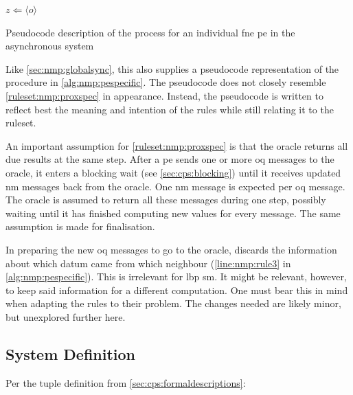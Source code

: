 \begin{algorithm}
{    \;
    
    \(z \Leftarrow \langle o \rangle\)\;
}
\caption[Pseudocode description of the process for an individual \gls{fne}  in the asynchronous system]{\label{alg:nmp:pespecific}Pseudocode description of the process for an individual \gls{fne} \gls{pe} in the asynchronous system}
\end{algorithm}

Like \cref{sec:nmp:globalsync}, this  also supplies a pseudocode representation of the procedure in \cref{alg:nmp:pespecific}.  The pseudocode does not closely resemble \cref{ruleset:nmp:proxspec} in appearance.  Instead, the pseudocode is written to reflect best the meaning and intention of the rules while still relating it to the \gls{ruleset}.

An important assumption for \cref{ruleset:nmp:proxspec} is that the oracle returns all due results at the same step.  After a \gls{pe} sends one or more \gls{oq} messages to the oracle, it enters a blocking wait (see \vref{sec:cps:blocking}) until it receives updated \gls{nm} messages back from the oracle.  One \gls{nm} message is expected per \gls{oq} message.  The oracle is assumed to return all these messages during one step, possibly waiting until it has finished computing new values for every message.  The same assumption is made for finalisation.

In preparing the new \gls{oq} messages to go to the oracle,  discards the information about which datum came from which neighbour (\cref{line:nmp:rule3} in \cref{alg:nmp:pespecific}).  This is irrelevant for \gls{lbp} \gls{sm}.  It might be relevant, however, to keep said information for a different computation.  One must bear this in mind when adapting the rules to their problem.  The changes needed are likely minor, but unexplored further here.

\subsection{System Definition}
Per the tuple definition from \cref{sec:cps:formaldescriptions}:


